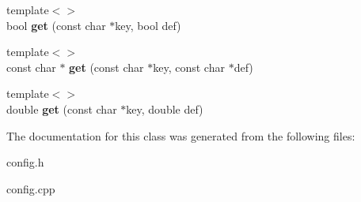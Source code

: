 \begin{DoxyCompactItemize}
\item 
\hypertarget{classConfig_aeb1e3d9528ac85d99ac240c127a230fe}{{\footnotesize template$<$$>$ }\\bool {\bfseries get} (const char $\ast$key, bool def)}\label{classConfig_aeb1e3d9528ac85d99ac240c127a230fe}

\item 
\hypertarget{classConfig_a7d43af7622dab5c20df7a02d0438db0f}{{\footnotesize template$<$$>$ }\\const char $\ast$ {\bfseries get} (const char $\ast$key, const char $\ast$def)}\label{classConfig_a7d43af7622dab5c20df7a02d0438db0f}

\item 
\hypertarget{classConfig_ae495cbb8c0575c30e9539d8ed6082a72}{{\footnotesize template$<$$>$ }\\double {\bfseries get} (const char $\ast$key, double def)}\label{classConfig_ae495cbb8c0575c30e9539d8ed6082a72}

\end{DoxyCompactItemize}


The documentation for this class was generated from the following files\-:\begin{DoxyCompactItemize}
\item 
config.\-h\item 
config.\-cpp\end{DoxyCompactItemize}
